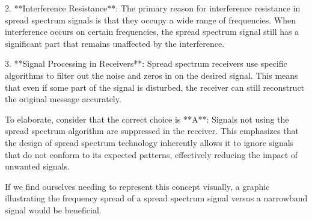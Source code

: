 2. **Interference Resistance**: The primary reason for interference resistance in spread spectrum signals is that they occupy a wide range of frequencies. When interference occurs on certain frequencies, the spread spectrum signal still has a significant part that remains unaffected by the interference.

3. **Signal Processing in Receivers**: Spread spectrum receivers use specific algorithms to filter out the noise and zeros in on the desired signal. This means that even if some part of the signal is disturbed, the receiver can still reconstruct the original message accurately.

To elaborate, consider that the correct choice is **A**: Signals not using the spread spectrum algorithm are suppressed in the receiver. This emphasizes that the design of spread spectrum technology inherently allows it to ignore signals that do not conform to its expected patterns, effectively reducing the impact of unwanted signals.

If we find ourselves needing to represent this concept visually, a graphic illustrating the frequency spread of a spread spectrum signal versus a narrowband signal would be beneficial. 

